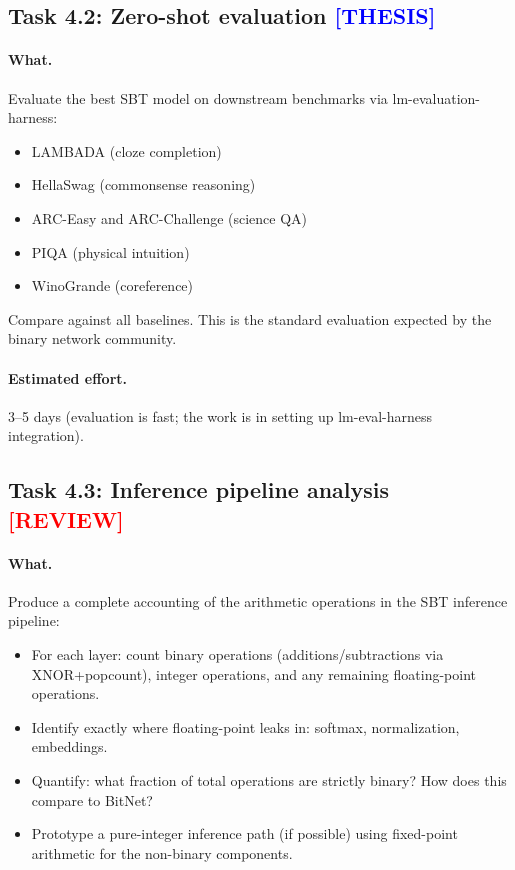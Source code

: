 \documentclass[12pt,a4paper]{article}
\newcommand{\review}{\texorpdfstring{\textcolor{red}{\textbf{[REVIEW]}}}{[REVIEW]}}
\newcommand{\thesis}{\texorpdfstring{\textcolor{blue}{\textbf{[THESIS]}}}{[THESIS]}}
\begin{document}
\subsection{Task 4.2: Zero-shot evaluation \thesis}

\paragraph{What.} Evaluate the best SBT model on downstream benchmarks via lm-evaluation-harness:
\begin{itemize}
    \item LAMBADA (cloze completion)
    \item HellaSwag (commonsense reasoning)
    \item ARC-Easy and ARC-Challenge (science QA)
    \item PIQA (physical intuition)
    \item WinoGrande (coreference)
\end{itemize}

Compare against all baselines. This is the standard evaluation expected by the binary network community.

\paragraph{Estimated effort.} 3--5 days (evaluation is fast; the work is in setting up lm-eval-harness integration).


\subsection{Task 4.3: Inference pipeline analysis \review}

\paragraph{What.} Produce a complete accounting of the arithmetic operations in the SBT inference pipeline:
\begin{itemize}
    \item For each layer: count binary operations (additions/subtractions via XNOR+popcount), integer operations, and any remaining floating-point operations.
    \item Identify exactly where floating-point leaks in: softmax, normalization, embeddings.
    \item Quantify: what fraction of total operations are strictly binary? How does this compare to BitNet?
    \item Prototype a pure-integer inference path (if possible) using fixed-point arithmetic for the non-binary components.
\end{itemize}
\end{document}

